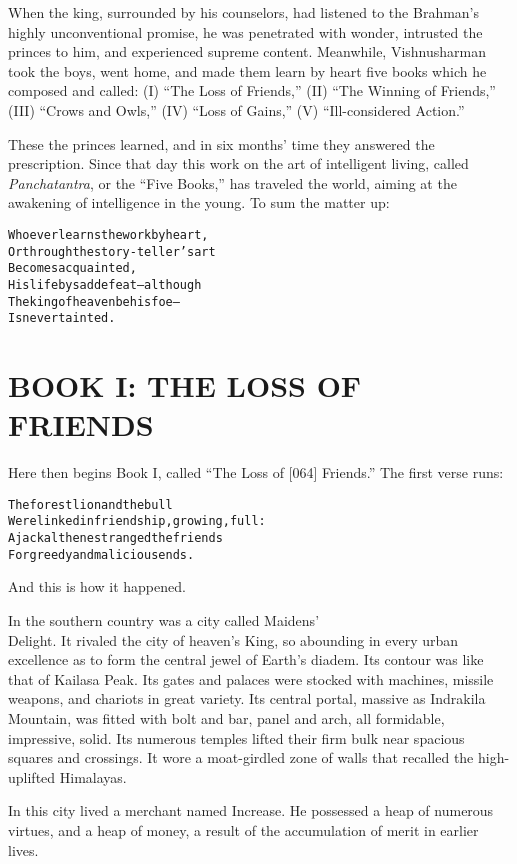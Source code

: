 \documentclass{article}
\renewenvironment{verbatim}{\begin{alltt}\normalfont\begin{centering}}{\end{centering}\end{alltt}}
\begin{document}
When the king, surrounded by his counselors, had listened to the
Brahman's highly unconventional promise, he was penetrated with
wonder, intrusted the princes to him, and experienced supreme
content. Meanwhile, Vishnusharman took the boys, went home, and
made them learn by heart five books which he composed and called:
(I) ``The Loss of Friends,'' (II) ``The Winning of Friends,'' (III)
``Crows and Owls,'' (IV) ``Loss of Gains,'' (V)
``Ill-considered Action.''

These the princes learned, and in six months' time they answered
the prescription. Since that day this work on the art of
intelligent living, called \emph{Panchatantra}, or the
``Five Books,'' has traveled the world, aiming at the awakening of
intelligence in the young. To sum the matter up:

\begin{verbatim}
Whoever learns the work by heart,
Or through the story-teller's art
    Becomes acquainted,
His life by sad defeat--although
The king of heaven be his foe--
    Is never tainted.
\end{verbatim}
\section{BOOK I: THE LOSS OF FRIENDS}

Here then begins Book I, called ``The Loss of [064] Friends.'' The
first verse runs:

\begin{verbatim}
The forest lion and the bull
Were linked in friendship, growing, full:
A jackal then estranged the friends
For greedy and malicious ends.
\end{verbatim}
And this is how it happened.

In the southern country was a city called Maidens'\\Delight. It
rivaled the city of heaven's King, so abounding in every urban
excellence as to form the central jewel of Earth's diadem. Its
contour was like that of Kailasa Peak. Its gates and palaces were
stocked with machines, missile weapons, and chariots in great
variety. Its central portal, massive as Indrakila Mountain, was
fitted with bolt and bar, panel and arch, all formidable,
impressive, solid. Its numerous temples lifted their firm bulk near
spacious squares and crossings. It wore a moat-girdled zone of
walls that recalled the high-uplifted Himalayas.

In this city lived a merchant named Increase. He possessed a heap
of numerous virtues, and a heap of money, a result of the
accumulation of merit in earlier lives.
\end{document}
